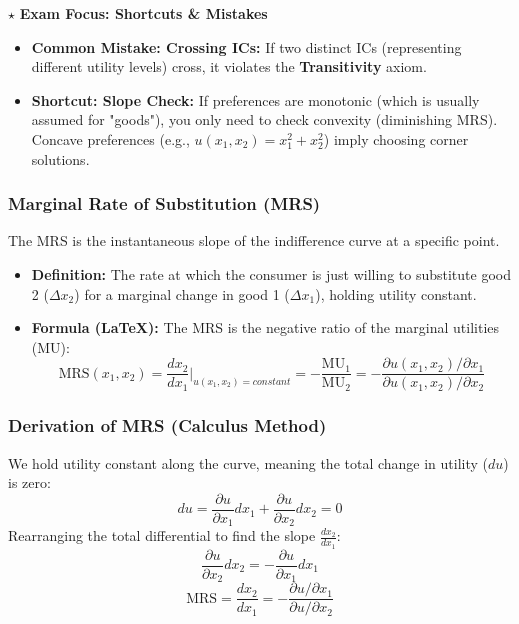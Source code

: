 \documentclass{article}
\begin{document}
$\star$ \textbf{Exam Focus: Shortcuts \& Mistakes}

\begin{itemize}
    \item \textbf{Common Mistake: Crossing ICs:} If two distinct ICs (representing different utility levels) cross, it violates the \textbf{Transitivity} axiom.

    \item \textbf{Shortcut: Slope Check:} If preferences are monotonic (which is usually assumed for "goods"), you only need to check convexity (diminishing MRS). Concave preferences (e.g., $u(x_1, x_2) = x_1^2 + x_2^2$) imply choosing corner solutions.
\end{itemize}

\subsubsection*{Marginal Rate of Substitution (MRS)}

The MRS is the instantaneous slope of the indifference curve at a specific point.

\begin{itemize}
    \item \textbf{Definition:} The rate at which the consumer is just willing to substitute good 2 ($\Delta x_2$) for a marginal change in good 1 ($\Delta x_1$), holding utility constant.

    \item \textbf{Formula (LaTeX):} The MRS is the negative ratio of the marginal utilities (MU): \[\text{MRS}(x_1, x_2) = \frac{dx_2}{dx_1} \bigg\rvert_{u(x_1, x_2)=constant} = -\frac{\text{MU}_1}{\text{MU}_2} = -\frac{\partial u(x_1, x_2)/\partial x_1}{\partial u(x_1, x_2)/\partial x_2}\]
\end{itemize}

\subsubsection*{Derivation of MRS (Calculus Method)}

We hold utility constant along the curve, meaning the total change in utility ($du$) is zero: \[du = \frac{\partial u}{\partial x_1} dx_1 + \frac{\partial u}{\partial x_2} dx_2 = 0\] Rearranging the total differential to find the slope $\frac{dx_2}{dx_1}$: \[\frac{\partial u}{\partial x_2} dx_2 = -\frac{\partial u}{\partial x_1} dx_1\] \[\text{MRS} = \frac{dx_2}{dx_1} = -\frac{\partial u/\partial x_1}{\partial u/\partial x_2}\]
\end{document}
